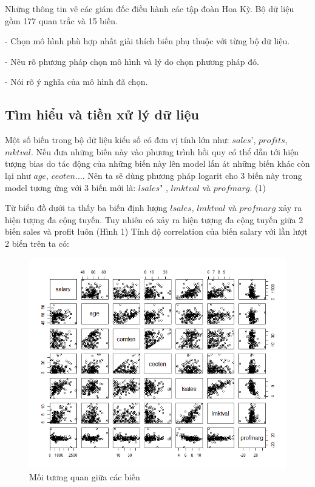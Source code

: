 \documentclass[a4paper]{article}
\begin{document}
	
Những thông tin vê các giám đốc điều hành các tập đoàn Hoa Kỳ. Bộ dữ liệu gồm 177 quan trắc và 15 biến.

- Chọn mô hình phù hợp nhất giải thích biến phụ thuộc với từng bộ dữ liệu.

- Nêu rõ phương pháp chọn mô hình và lý do chọn phương pháp đó.

- Nói rõ ý nghĩa của mô hình đã chọn.
\subsection*{Tìm hiểu và tiền xử lý dữ liệu}

Một số biến trong bộ dữ liệu kiểu số có đơn vị tính lớn như: $\textit{sales'}$, $\textit{profits}$, $\textit{mktval}$. Nếu đưa những biến này vào phương trình hồi quy có thể dẫn tới hiện tượng bias do tác động của những biến này lên model lấn át những biến khác còn lại như $\textit{age}$, $\textit{ceoten}$.... Nên ta sẽ dùng phương pháp logarit cho 3 biến này trong model tương ứng với 3 biến mới là:  $\textit{lsales"}$ , $\textit{lmktval}$   và $\textit{profmarg}$. (1)


Từ biểu đồ dưới ta thấy ba biến định lượng $\textit{lsales}$, $\textit{lmktval}$ và $\textit{profmarg}$ xảy ra hiện tượng đa cộng tuyến.
Tuy nhiên có xảy ra hiện tượng đa cộng tuyến giữa 2 biến sales và profit luôn (Hình 1)
Tính độ correlation của biến salary với lần lượt 2 biến trên ta có:

\begin{figure}[h!]
	\centering
	\includegraphics[scale = 0.7]{../Photo Of Result/B1_plotVriables.png}  
	\caption{Mối tương quan giữa các biến}
	\label{ex1:model:1}
\end{figure}
\end{document}

